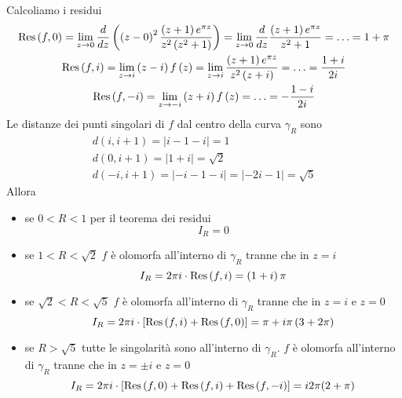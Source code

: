 Calcoliamo i residui
\begin{gather*}
\operatorname{Res} \left(f,0\right) = \lim _{z\rightarrow 0}\frac{d}{dz}\left(\left(z - 0\right)^{2}\frac{\left(z + 1\right) e^{\pi z}}{z^{2}\left(z^{2} + 1\right)}\right) = \lim _{z\rightarrow 0}\frac{d}{dz}\frac{\left(z + 1\right) e^{\pi z}}{z^{2} + 1} = \dotsc = 1 + \pi \\
\operatorname{Res} \left(f,i\right) = \lim _{z\rightarrow i}\left(z - i\right) f\left(z\right) = \lim _{z\rightarrow i}\frac{\left(z + 1\right) e^{\pi z}}{z^{2}\left(z + i\right)} = \dotsc = \frac{1 + i}{2i}\\
\operatorname{Res} \left(f, - i\right) = \lim _{z\rightarrow - i}\left(z + i\right) f\left(z\right) = \dotsc = - \frac{1 - i}{2i}
\end{gather*}
Le distanze dei punti singolari di $f$ dal centro della curva $\gamma _{R}$ sono
\begin{gather*}
d\left(i,i + 1\right) = \left| i - 1 - i\right| = 1\\
d\left(0,i + 1\right) = \left| 1 + i\right| = \sqrt{2}\\
d\left(- i,i + 1\right) = \left| - i - 1 - i\right| = \left| - 2i - 1\right| = \sqrt{5}
\end{gather*}
Allora
\begin{itemize}
\item se $0 < R < 1$ per il teorema dei residui
\begin{equation*}
I_{R} = 0
\end{equation*}
\item se $1 < R < \sqrt{2}$ $f$ è olomorfa all'interno di $\gamma _{R}$ tranne che in $z = i$
\begin{equation*}
I_{R} = 2\pi i\cdot \operatorname{Res} \left(f,i\right) = \left(1 + i\right) \pi 
\end{equation*}
\item se $\sqrt{2} < R < \sqrt{5}$ $f$ è olomorfa all'interno di $\gamma _{R}$ tranne che in $z = i$ e $z = 0$
\begin{equation*}
I_{R} = 2\pi i\cdot \left[\operatorname{Res} \left(f,i\right) + \operatorname{Res} \left(f,0\right)\right] = \pi + i\pi \left(3 + 2\pi\right)
\end{equation*}
\item se $R > \sqrt{5}$ tutte le singolarità sono all'interno di $\gamma _{R}$. $f$ è olomorfa all'interno di $\gamma _{R}$ tranne che in $z = \pm i$ e $z = 0$
\begin{equation*}
I_{R} = 2\pi i\cdot \left[\operatorname{Res} \left(f,0\right) + \operatorname{Res} \left(f,i\right) + \operatorname{Res} \left(f, - i\right)\right] = i2\pi (2 + \pi)
\end{equation*}
\end{itemize}

